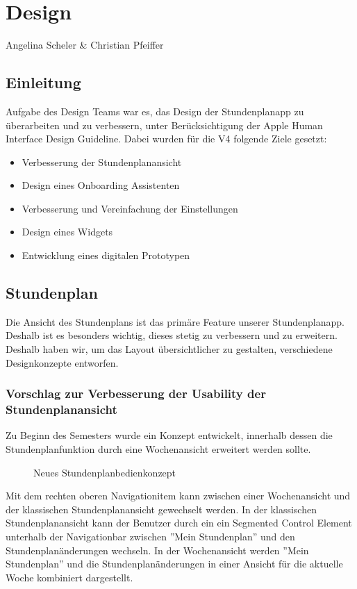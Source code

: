 \chapter{Design}
Angelina Scheler \& Christian Pfeiffer

\section{Einleitung}
Aufgabe des Design Teams war es, das Design der Stundenplanapp zu überarbeiten und zu verbessern, unter Berücksichtigung der Apple Human Interface Design Guideline. Dabei wurden für die V4 folgende Ziele gesetzt:

\begin{itemize}
\item Verbesserung der Stundenplanansicht
\item Design eines Onboarding Assistenten
\item Verbesserung und Vereinfachung der Einstellungen
\item Design eines Widgets
\item Entwicklung eines digitalen Prototypen
\end{itemize}


\section{Stundenplan}
Die Ansicht des Stundenplans ist das primäre Feature unserer Stundenplanapp. Deshalb ist es besonders wichtig, dieses stetig zu verbessern und zu erweitern.
Deshalb haben wir, um das Layout übersichtlicher zu gestalten, verschiedene Designkonzepte entworfen.

\subsection{Vorschlag zur Verbesserung der Usability der Stundenplanansicht}
Zu Beginn des Semesters wurde ein Konzept entwickelt, innerhalb dessen die Stundenplanfunktion durch eine Wochenansicht erweitert werden sollte. 

\begin{figure}[H]
	\centering
	\caption{Neues Stundenplanbedienkonzept}
	\label{fig1}
\end{figure}

Mit dem rechten oberen Navigationitem kann zwischen einer Wochenansicht und der klassischen Stundenplanansicht gewechselt werden. In der klassischen Stundenplanansicht kann der Benutzer durch ein ein Segmented Control Element unterhalb der Navigationbar zwischen ''Mein Stundenplan'' und den Stundenplanänderungen wechseln. In der Wochenansicht werden ''Mein Stundenplan'' und die Stundenplanänderungen in einer Ansicht für die aktuelle Woche kombiniert dargestellt. 

